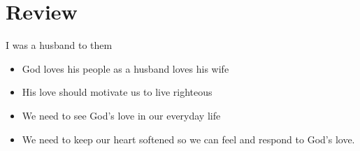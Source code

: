 \section{Review}

\begin{frame}{I was a husband to them}
	\begin{itemize}
		\item God loves his people as a husband loves his wife
		\item His love should motivate us to live righteous
		\item We need to see God's love in our everyday life
		\item We need to keep our heart softened so we can feel and respond to God's love.
	\end{itemize}
	
\end{frame}